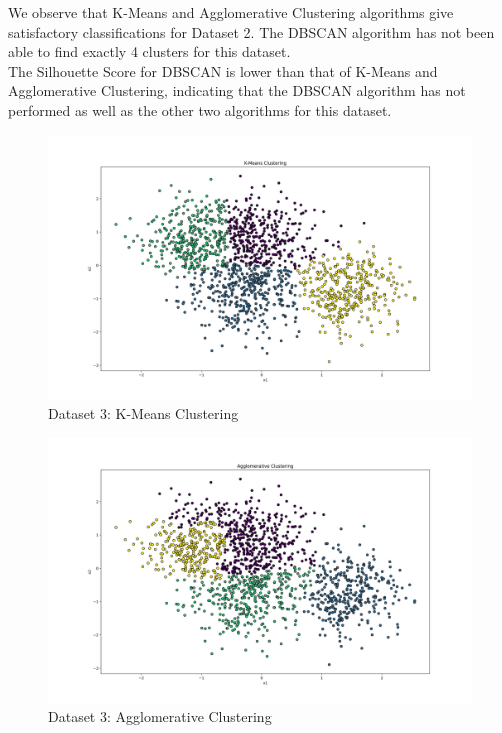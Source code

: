 We observe that K-Means and Agglomerative Clustering algorithms give satisfactory classifications for Dataset 2. The DBSCAN algorithm has not been able to find exactly 4 clusters for this dataset. \\

The Silhouette Score for DBSCAN is lower than that of K-Means and Agglomerative Clustering, indicating that the DBSCAN algorithm has not performed as well as the other two algorithms for this dataset.

\clearpage

\begin{figure}[H]
	\centering
	\includegraphics[width=0.9\linewidth]{Images/Clusters-5-v2-K-Means Clustering.png}
	\caption{Dataset 3: K-Means Clustering}
	\label{fig:clusters-5-v2-k-means-clustering}
\end{figure}

\begin{figure}[H]
	\centering
	\includegraphics[width=0.9\linewidth]{Images/Clusters-5-v2-Agglomerative Clustering.png}
	\caption{Dataset 3: Agglomerative Clustering}
	\label{fig:clusters-5-v2-agglomerative-clustering}
\end{figure}

